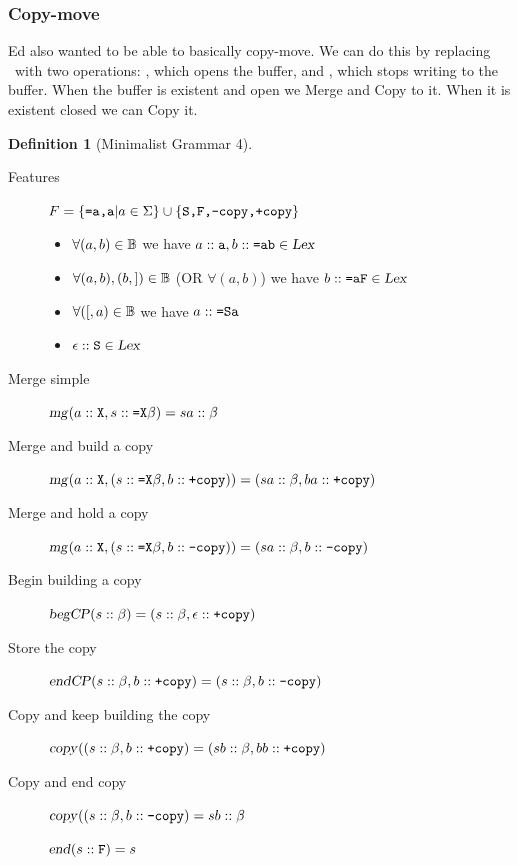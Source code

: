 \documentclass[12pt]{article}
\theoremstyle{definition}
\newtheorem{definition}{Definition}[section]
\begin{document}
\subsubsection{Copy-move}
\label{sec:copy-move}

\newcommand\bcp{\text{\textsl{begCP}}}
\newcommand\ecp{\text{\textsl{endCP}}}


Ed also wanted to be able to basically copy-move. We can do this by replacing \cl~with two operations: \bcp, which opens the buffer, and \ecp, which stops writing to the buffer. When the buffer is existent and open we Merge and Copy to it. When it is existent closed we can Copy it. 

\begin{definition}[Minimalist Grammar 4]\ 


  \begin{description}
  \item[Features] $F=\{\text{\texttt{=a,a}} | a\in \Sigma \}\cup\{\text{\texttt{S,F,-copy,+copy}}\}$

  \item[\Lex]
    \begin{itemize}
    \item $\forall (a,b) \in \mathbb{B}$ we have
      $a::\text{\texttt{a}}, b::\text{\texttt{=ab}} \in \text{\textsl{Lex}}$
    \item $\forall (a,b),(b,{]})\in\mathbb{B}$ (OR $\forall (a,b)$) we have $b::\text{\texttt{=aF}}\in\text{\textsl{Lex}}$
    \item $\forall ({[},a)\in\mathbb{B}$ we have $a::\text{\texttt{=Sa}}$
    \item $\epsilon::\text{\texttt{S}}\in\text{\textsl{Lex}}$
    \end{itemize}

  \item[Merge simple] $\text{\textsl{mg}}( a::\text{\texttt{X}}, s::\text{\texttt{=X}}\beta) = sa::\beta$
  \item[Merge and build a copy] $\text{\textsl{mg}}( a::\text{\texttt{X}}, (s::\text{\texttt{=X}}\beta,b::\text{\texttt{+copy}})) = (sa::\beta,ba::\text{\texttt{+copy}})$
  \item[Merge and hold a copy] $\text{\textsl{mg}}( a::\text{\texttt{X}}, (s::\text{\texttt{=X}}\beta,b::\text{\texttt{-copy}})) = (sa::\beta,b::\text{\texttt{-copy}})$
  \item[Begin building a copy] $\bcp(s::\beta) = (s::\beta,\emp::\fea{+copy})$
  \item[Store the copy] $\ecp(s::\beta,b::\fea{+copy}) = (s::\beta,b::\fea{-copy})$


  \item[Copy and keep building the copy] $\text{\textsl{copy}}((s::\beta,b::\text{\texttt{+copy}}) = (sb::\beta, bb::\text{\texttt{+copy}})$
  \item[Copy and end copy] $\text{\textsl{copy}}((s::\beta,b::\text{\texttt{-copy}}) = sb::\beta$

  \item[\ed] $\text{\textsl{end}}(s::\text{\texttt{F}}) = s$


  \end{description}


\end{definition}
\end{document}
